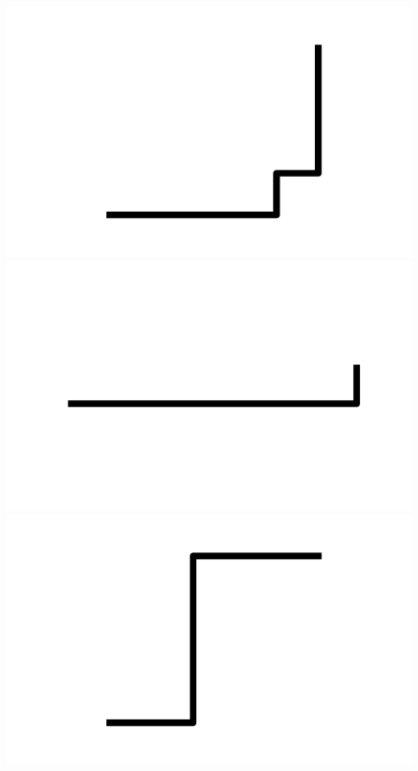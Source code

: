 \documentclass[]{report}
\begin{document}
\includegraphics[scale=.1]{pictures/21/state_cluster_shapes_337.pdf} 
\includegraphics[scale=.1]{pictures/21/state_cluster_shapes_338.pdf} 
\includegraphics[scale=.1]{pictures/21/state_cluster_shapes_339.pdf} 
\end{document}
